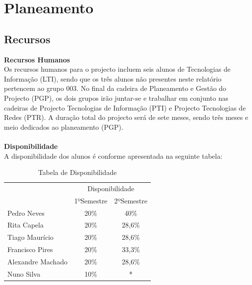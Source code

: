 \documentclass[12pt, a4paper, twoside]{report} %
\begin{document}

\chapter{Planeamento}

\section{Recursos}

\textbf{Recursos Humanos}
\\

Os recursos humanos para o projecto incluem seis alunos de Tecnologias de Informação (LTI), sendo que os três alunos não presentes neste relatório pertencem ao grupo 003. 
No final da cadeira de Planeamento e Gestão do Projecto (PGP), os dois grupos irão juntar-se e trabalhar em conjunto nas cadeiras de Projecto Tecnologias de Informação (PTI) e Projecto Tecnologias de Redes (PTR). A duração total do projecto será de sete meses, sendo três meses e meio dedicados ao planeamento (PGP).
\\
\\
\textbf{Disponibilidade}
\\

A disponibilidade dos alunos é conforme apresentada na seguinte tabela:

\begin{table}[h]
\centering
\begin{tabular}{|l|c c|}
\hline
\multirow{2}{*}{} & \multicolumn{2}{c|}{Disponibilidade} \\ \cline{2-3} 
						& 1ºSemestre        & 2ºSemestre       \\ \hline
Pedro Neves       		& 20\%              & 40\%             \\ \hline
Rita Capela       		& 20\%              & 28,6\%           \\ \hline
Tiago Maurício    		& 20\%              & 28,6\%           \\ \hline
Francisco Pires   		& 20\%              & 33,3\%           \\ \hline
Alexandre Machado 		& 20\%              & 28,6\%           \\ \hline
Nuno Silva\footnotemark	& 10\%              & *                \\ \hline
\end{tabular}
\caption{Tabela de Disponibilidade}
\label{disponibilidade}
\end{table}
\end{document}
